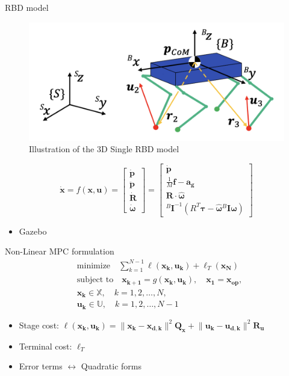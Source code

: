 \documentclass{beamer}
\begin{document}
\begin{frame}{RBD model}
\begin{figure}
    \centering
    \includegraphics[width=0.6\linewidth]{../Presentation-1/Illustration-RBD-model.png}
    \caption{Illustration of the 3D Single RBD model}
    \label{fig:rbd-model}
\end{figure}
\begin{equation*}
    \mathbf{\dot{x}} = f(\mathbf{x}, \mathbf{u}) = 
    \begin{bmatrix}
    \mathbf{\dot{p}} \\
    \mathbf{\ddot{p}} \\
    \mathbf{\dot{R}} \\
    \boldsymbol{\dot{\omega}}
    \end{bmatrix}
    =
    \begin{bmatrix}
    \mathbf{\dot{p}} \\
    \frac{1}{M} \mathbf{f} - \mathbf{a_g} \\
    \mathbf{R} \cdot \hat{\boldsymbol{\omega}} \\
    {}^{B} \mathbf{I}^{-1}(R^T \boldsymbol{\tau} - \hat{\boldsymbol{\omega}} {}^{B} \mathbf{I} \boldsymbol{\omega})
    \end{bmatrix}
\end{equation*}
\begin{itemize}
    \item Gazebo
\end{itemize}
\end{frame}


\begin{frame}{Non-Linear MPC formulation}
\begin{equation*}
\begin{aligned}
    & \text{minimize} \quad \sum_{k=1}^{N-1} \ell(\mathbf{x_k}, \mathbf{u_k}) + \ell_T(\mathbf{x_N}) \\
    & \text{subject to} \quad \mathbf{x_{k+1}} = g(\mathbf{x_k}, \mathbf{u_k}), \quad \mathbf{x_1} = \mathbf{x_\text{op}}, \\
    & \mathbf{x_k} \in \mathbb{X}, \quad k = 1, 2, \dots, N, \\
    & \mathbf{u_k} \in \mathbb{U}, \quad k = 1, 2, \dots, N-1
\end{aligned}
\end{equation*}
\begin{itemize}
    \item Stage cost: $ \ell(\mathbf{x_k}, \mathbf{u_k}) = \lVert \mathbf{x_k} - \mathbf{x_{d, k}} \rVert ^ 2 \mathbf{Q_x} + \lVert \mathbf{u_k} - \mathbf{u_{d, k}} \rVert ^ 2 \mathbf{R_u}$
    \item Terminal cost: $ \ell_T $
    \item Error terms $\leftrightarrow$ Quadratic forms
\end{itemize}
\end{frame}
\end{document}
